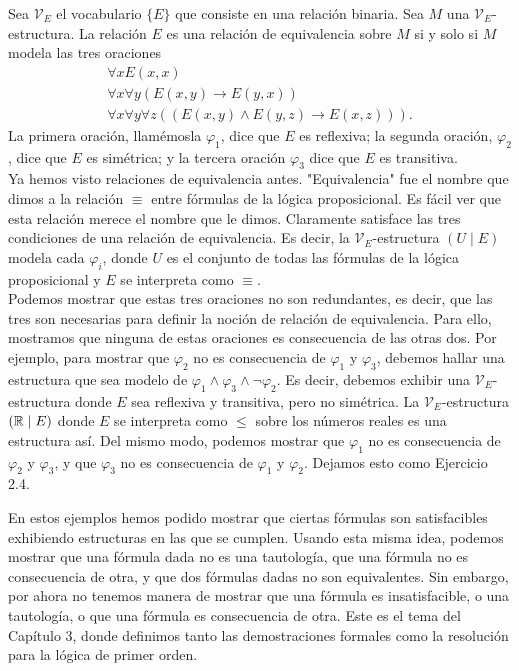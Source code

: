 \documentclass[12pt,a4paper]{book}
\newcommand{\comillas}[1]{"#1"}
\newcommand{\VV}{\mathcal{V}}
\begin{document}
    \begin{ejemplo}\label{ej:relacion-equivalencia-fol}
        Sea $\VV_{E}$ el vocabulario $\{E\}$ que consiste en una relación binaria. Sea $M$ una $\VV_{E}$-estructura. La
        relación $E$ es una relación de equivalencia sobre $M$ si y solo si $M$ modela las tres oraciones
        \begin{gather*}
            \forall xE(x,x)\\
            \forall x\forall y(E(x,y)\rightarrow E(y,x))\\
            \forall x\forall y\forall z((E(x,y)\wedge E(y,z)\rightarrow E(x,z))).
        \end{gather*}
        La primera oración, llamémosla $\varphi_{1}$, dice que $E$ es reflexiva; la segunda oración, $\varphi_{2}$, dice
        que $E$ es simétrica; y la tercera oración $\varphi_{3}$ dice que $E$ es transitiva.\\
        Ya hemos visto relaciones de equivalencia antes. \comillas{Equivalencia} fue el nombre que dimos a la relación
        $\equiv$ entre fórmulas de la lógica proposicional. Es fácil ver que esta relación merece el nombre que le dimos.
        Claramente satisface las tres condiciones de una relación de equivalencia. Es decir, la $\VV_{E}$-estructura
        $(U\mid E)$ modela cada $\varphi_{i}$, donde $U$ es el conjunto de todas las fórmulas de la lógica proposicional y
        $E$ se interpreta como $\equiv$.\\
        Podemos mostrar que estas tres oraciones no son redundantes, es decir, que las tres son necesarias para definir la
        noción de relación de equivalencia. Para ello, mostramos que ninguna de estas oraciones es consecuencia de las
        otras dos. Por ejemplo, para mostrar que $\varphi_{2}$ no es consecuencia de $\varphi_{1}$ y $\varphi_{3}$, debemos
        hallar una estructura que sea modelo de $\varphi_{1}\wedge\varphi_{3}\wedge\neg\varphi_{2}$. Es decir, debemos
        exhibir una $\VV_{E}$-estructura donde $E$ sea reflexiva y transitiva, pero no simétrica. La $\VV_{E}$-estructura
        $(\mathbb{R}\mid E)$ donde $E$ se interpreta como $\leq$ sobre los números reales es una estructura así. Del mismo modo,
        podemos mostrar que $\varphi_{1}$ no es consecuencia de $\varphi_{2}$ y $\varphi_{3}$, y que $\varphi_{3}$ no es
        consecuencia de $\varphi_{1}$ y $\varphi_{2}$. Dejamos esto como Ejercicio 2.4.
    \end{ejemplo}

    En estos ejemplos hemos podido mostrar que ciertas fórmulas son satisfacibles exhibiendo estructuras en las que se
    cumplen. Usando esta misma idea, podemos mostrar que una fórmula dada no es una tautología, que una fórmula no es
    consecuencia de otra, y que dos fórmulas dadas no son equivalentes. Sin embargo, por ahora no tenemos manera de mostrar
    que una fórmula es insatisfacible, o una tautología, o que una fórmula es consecuencia de otra. Este es el tema del
    Capítulo 3, donde definimos tanto las demostraciones formales como la resolución para la lógica de primer orden.
\end{document}
